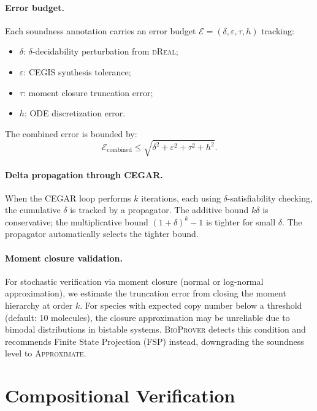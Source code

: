 \documentclass[11pt]{article}
\newcommand{\bioprover}{\textsc{BioProver}}
\newcommand{\cegar}{\textsc{CEGAR}}
\newcommand{\cegis}{\textsc{CEGIS}}
\newcommand{\dreal}{\textsc{dReal}}
\begin{document}
\paragraph{Error budget.}
Each soundness annotation carries an error budget $\mathcal{E} =
(\delta, \varepsilon, \tau, h)$ tracking:
\begin{itemize}[itemsep=1pt]
\item $\delta$: $\delta$-decidability perturbation from \dreal{};
\item $\varepsilon$: \cegis{} synthesis tolerance;
\item $\tau$: moment closure truncation error;
\item $h$: ODE discretization error.
\end{itemize}
The combined error is bounded by:
\begin{equation}
  \mathcal{E}_{\text{combined}} \leq
  \sqrt{\delta^2 + \varepsilon^2 + \tau^2 + h^2}.
\end{equation}

\paragraph{Delta propagation through \cegar{}.}
When the \cegar{} loop performs $k$ iterations, each using
$\delta$-satisfiability checking, the cumulative $\delta$ is tracked
by a propagator. The additive bound $k\delta$ is conservative; the
multiplicative bound $(1+\delta)^k - 1$ is tighter for small $\delta$.
The propagator automatically selects the tighter bound.

\paragraph{Moment closure validation.}
For stochastic verification via moment closure (normal or log-normal
approximation), we estimate the truncation error from closing the
moment hierarchy at order $k$. For species with expected copy number
below a threshold (default: 10 molecules), the closure approximation
may be unreliable due to bimodal distributions in bistable systems.
\bioprover{} detects this condition and recommends Finite State
Projection (FSP) instead, downgrading the soundness level to
\textsc{Approximate}.

\section{Compositional Verification}
\label{sec:compositional}
\end{document}
